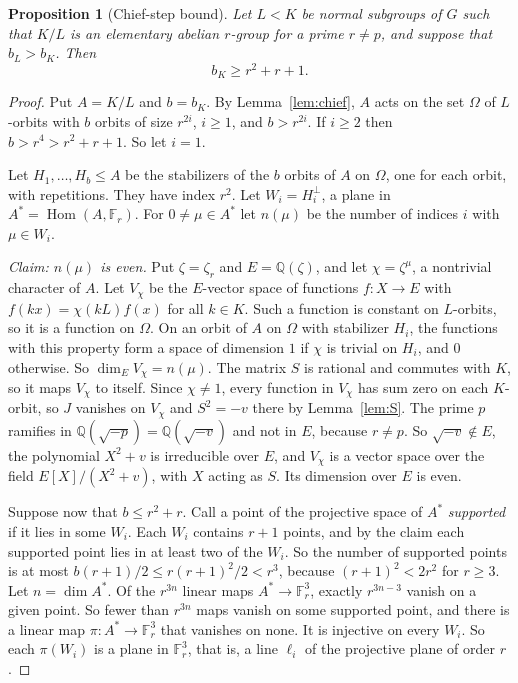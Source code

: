 \documentclass[11pt]{amsart}
\newtheorem{proposition}[theorem]{Proposition}
\theoremstyle{definition}
\theoremstyle{remark}
\newcommand{\Q}{\mathbb{Q}}
\newcommand{\F}{\mathbb{F}}
\begin{document}
\begin{proposition}[Chief-step bound]\label{prop:chiefbound}
Let $L<K$ be normal subgroups of $G$ such that $K/L$ is an elementary abelian $r$-group for a prime $r\ne p$, and suppose that $b_L>b_K$. Then
\[
b_K\ge r^2+r+1 .
\]
\end{proposition}
\begin{proof}
Put $A=K/L$ and $b=b_K$. By Lemma~\ref{lem:chief}, $A$ acts on the set $\Omega$ of $L$-orbits with $b$ orbits of size $r^{2i}$, $i\ge1$, and $b>r^{2i}$. If $i\ge2$ then $b>r^4>r^2+r+1$. So let $i=1$.

Let $H_1,\dots,H_b\le A$ be the stabilizers of the $b$ orbits of $A$ on $\Omega$, one for each orbit, with repetitions. They have index $r^2$. Let $W_i=H_i^\perp$, a plane in $A^*=\operatorname{Hom}(A,\F_r)$. For $0\ne\mu\in A^*$ let $n(\mu)$ be the number of indices $i$ with $\mu\in W_i$.

\emph{Claim: $n(\mu)$ is even.} Put $\zeta=\zeta_r$ and $E=\Q(\zeta)$, and let $\chi=\zeta^{\mu}$, a nontrivial character of $A$. Let $V_\chi$ be the $E$-vector space of functions $f\colon X\to E$ with $f(kx)=\chi(kL)f(x)$ for all $k\in K$. Such a function is constant on $L$-orbits, so it is a function on $\Omega$. On an orbit of $A$ on $\Omega$ with stabilizer $H_i$, the functions with this property form a space of dimension $1$ if $\chi$ is trivial on $H_i$, and $0$ otherwise. So $\dim_EV_\chi=n(\mu)$. The matrix $S$ is rational and commutes with $K$, so it maps $V_\chi$ to itself. Since $\chi\ne1$, every function in $V_\chi$ has sum zero on each $K$-orbit, so $J$ vanishes on $V_\chi$ and $S^2=-v$ there by Lemma~\ref{lem:S}. The prime $p$ ramifies in $\Q(\sqrt{-p})=\Q(\sqrt{-v})$ and not in $E$, because $r\ne p$. So $\sqrt{-v}\notin E$, the polynomial $X^2+v$ is irreducible over $E$, and $V_\chi$ is a vector space over the field $E[X]/(X^2+v)$, with $X$ acting as $S$. Its dimension over $E$ is even.

Suppose now that $b\le r^2+r$. Call a point of the projective space of $A^*$ \emph{supported} if it lies in some $W_i$. Each $W_i$ contains $r+1$ points, and by the claim each supported point lies in at least two of the $W_i$. So the number of supported points is at most $b(r+1)/2\le r(r+1)^2/2<r^3$, because $(r+1)^2<2r^2$ for $r\ge3$. Let $n=\dim A^*$. Of the $r^{3n}$ linear maps $A^*\to\F_r^3$, exactly $r^{3n-3}$ vanish on a given point. So fewer than $r^{3n}$ maps vanish on some supported point, and there is a linear map $\pi\colon A^*\to\F_r^3$ that vanishes on none. It is injective on every $W_i$. So each $\pi(W_i)$ is a plane in $\F_r^3$, that is, a line $\ell_i$ of the projective plane of order $r$.


\end{proof}
\end{document}
